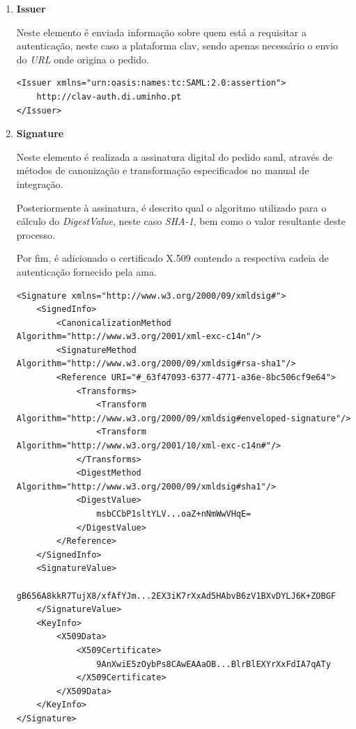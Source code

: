 \begin{enumerate}
    \item \textbf{Issuer}
    
    Neste elemento é enviada informação sobre quem está a requisitar a autenticação, neste caso a plataforma \gls{clav}, sendo apenas necessário o envio do \emph{URL} onde origina o pedido\cite{manualAuthGov}.
    
    \begin{lstlisting}
<Issuer xmlns="urn:oasis:names:tc:SAML:2.0:assertion">
    http://clav-auth.di.uminho.pt
</Issuer>
    \end{lstlisting}
    
    \vspace{-10mm}
    \item \textbf{Signature}
    
    Neste elemento é realizada a assinatura digital do pedido \gls{saml}, através de métodos de canonização e transformação especificados no manual de integração\cite{manualAuthGov}.
    
    Posteriormente à assinatura, é descrito qual o algoritmo utilizado para o cálculo do \emph{DigestValue}, neste caso \emph{SHA-1}, bem como o valor resultante deste processo.
    
    Por fim, é adicionado o certificado X.509 contendo a respectiva cadeia de autenticação fornecido pela \gls{ama}.
    
    \begin{lstlisting}
<Signature xmlns="http://www.w3.org/2000/09/xmldsig#">
    <SignedInfo>
        <CanonicalizationMethod Algorithm="http://www.w3.org/2001/xml-exc-c14n"/>
        <SignatureMethod Algorithm="http://www.w3.org/2000/09/xmldsig#rsa-sha1"/>
        <Reference URI="#_63f47093-6377-4771-a36e-8bc506cf9e64">
            <Transforms>
                <Transform Algorithm="http://www.w3.org/2000/09/xmldsig#enveloped-signature"/>
                <Transform Algorithm="http://www.w3.org/2001/10/xml-exc-c14n#"/>
            </Transforms>
            <DigestMethod Algorithm="http://www.w3.org/2000/09/xmldsig#sha1"/>
            <DigestValue>
                msbCCbP1sltYLV...oaZ+nNmWwVHqE=
            </DigestValue>
        </Reference>
    </SignedInfo>
    <SignatureValue>
            gB656A8kkR7TujX8/xfAfYJm...2EX3iK7rXxAd5HAbvB6zV1BXvDYLJ6K+ZOBGF
    </SignatureValue>
    <KeyInfo>
        <X509Data>
            <X509Certificate>
                9AnXwiE5zOybPs8CAwEAAaOB...BlrBlEXYrXxFdIA7qATy
            </X509Certificate>
        </X509Data>
    </KeyInfo>
</Signature>
    \end{lstlisting}
    

\end{enumerate}
